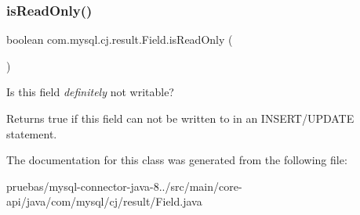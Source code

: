 \subsubsection{\texorpdfstring{is\+Read\+Only()}{isReadOnly()}}
{\footnotesize\ttfamily boolean com.\+mysql.\+cj.\+result.\+Field.\+is\+Read\+Only (\begin{DoxyParamCaption}{ }\end{DoxyParamCaption})}

Is this field {\itshape definitely} not writable?

\begin{DoxyReturn}{Returns}
true if this field can not be written to in an I\+N\+S\+E\+R\+T/\+U\+P\+D\+A\+TE statement. 
\end{DoxyReturn}


The documentation for this class was generated from the following file\+:\begin{DoxyCompactItemize}
\item 
pruebas/mysql-\/connector-\/java-\/8../src/main/core-\/api/java/com/mysql/cj/result/Field.\+java\end{DoxyCompactItemize}
